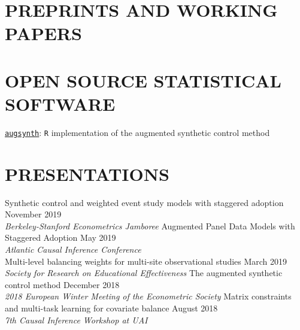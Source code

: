 \documentclass{res}
\begin{document}
\begin{resume}
\section{PREPRINTS AND WORKING PAPERS}
\medskip
\hspace{0.2em} 
\vskip -8pt
\hspace{0.2em} 
\section{OPEN SOURCE STATISTICAL SOFTWARE}
\hspace{0.2em} \href{https://github.com/ebenmichael/augsynth}{\texttt{augsynth}}: \texttt{R} implementation of the augmented synthetic control method
\section{PRESENTATIONS}
\medskip
\hspace{0.2em} Synthetic control and weighted event study models with staggered adoption \hfill November 2019\\
\emph{Berkeley-Stanford Econometrics Jamboree}
\vskip -8pt
\hspace{0.2em} Augmented Panel Data Models with Staggered Adoption \hfill May 2019\\
\emph{Atlantic Causal Inference Conference}\\
\hspace{2em}{\footnotesize Thomas R. Ten Have Poster Award runner up}
\vskip -8pt
\hspace{0.2em} Multi-level balancing weights for multi-site observational studies \hfill March 2019\\
\emph{Society for Research on Educational Effectiveness}
\vskip -8pt
\hspace{0.2em} The augmented synthetic control method \hfill December 2018\\ \emph{2018 European Winter Meeting of the Econometric Society}
\vskip -8pt
\hspace{0.2em} Matrix constraints and multi-task learning for covariate balance \hfill August 2018\\ \emph{7th Causal Inference Workshop at UAI}


\end{resume}
\end{document}
